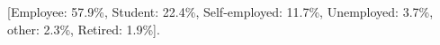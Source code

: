 [Employee: 57.9\%, Student: 22.4\%, Self-employed: 11.7\%, Unemployed: 3.7\%, other: 2.3\%, Retired: 1.9\%].